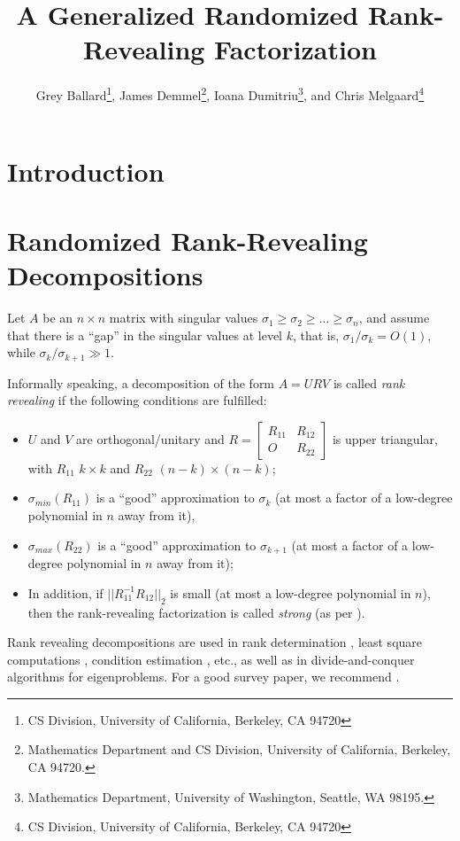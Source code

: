 \documentclass{article}
\title{A Generalized Randomized Rank-Revealing Factorization}
\author{Grey Ballard\thanks{CS Division, University of California, Berkeley, CA 94720},
James Demmel\thanks{Mathematics Department and CS Division,
University of California, Berkeley, CA 94720.},
Ioana Dumitriu\thanks{Mathematics Department, University of Washington, Seattle, WA 98195.}, and Chris Melgaard\thanks{CS Division, University of California, Berkeley, CA 94720}}
\theoremstyle{definition}
\begin{document}
\maketitle

\begin{abstract}

\end{abstract}

\section{Introduction} \label{Intro} 

\section{Randomized Rank-Revealing Decompositions} \label{rrdr}

Let $A$ be an $n \times n$ matrix with singular values $\sigma_1 \geq \sigma_2 \geq \ldots \geq \sigma_n$, and assume that there is a ``gap'' in the singular values at level $k$, that is, $\sigma_1/\sigma_k = O(1)$, while $\sigma_k/\sigma_{k+1} \gg 1$. 

Informally speaking, a decomposition of the form $A = URV$ is called \emph{rank revealing} if the following conditions are fulfilled:
\begin{itemize}
\item[1)] $U$ and $V$ are orthogonal/unitary and $R = \left [ \begin{array}{cc} R_{11} & R_{12} \\ O & R_{22} \end{array} \right ]$ is upper triangular, with $R_{11}$  $k \times k$ and  $R_{22}$  $(n-k) \times (n-k)$;
\item[2)] $\sigma_{min}(R_{11})$ is a ``good'' approximation to $\sigma_k$ (at most a factor of a low-degree polynomial in $n$ away from it),
\item[(3)] $\sigma_{max}(R_{22})$ is a ``good'' approximation to $\sigma_{k+1}$ (at most a factor of a low-degree polynomial in $n$ away from it);
\item[(4)] In addition, if $||R_{11}^{-1}R_{12}||_2$ is small (at most a low-degree polynomial in $n$), then the rank-revealing factorization is called  \emph{strong} (as per \cite{GE96}).

\end{itemize}

Rank revealing decompositions are used in rank determination \cite{stewart84}, least square computations \cite{CH92}, 
condition estimation \cite{bischof90a}, etc.,
as well as in divide-and-conquer algorithms for eigenproblems.
For a good survey paper, we recommend \cite{GE96}.
\end{document}
